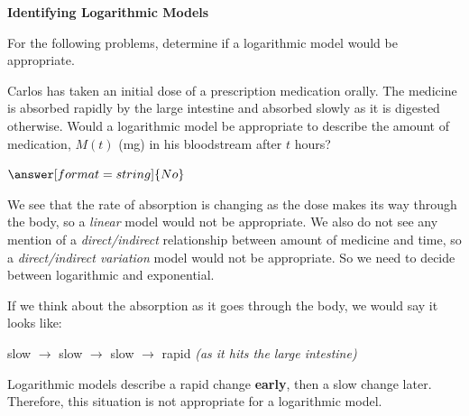 \documentclass{ximera}
\begin{document}
\begin{center} \textbf{\Large Identifying Logarithmic Models} \end{center}

For the following problems, determine if a logarithmic model would be appropriate. 


\begin{question}
Carlos has taken an initial dose of a prescription medication orally. The medicine is absorbed rapidly by the large intestine and absorbed slowly as it is digested otherwise. Would a logarithmic model be appropriate to describe the amount of medication, $M(t)$ (mg) in his bloodstream after $t$ hours?

$\answer[format=string]{No}$

\begin{feedback}
We see that the rate of absorption is changing as the dose makes its way through the body, so a \textit{linear} model would not be appropriate. We also do not see any mention of a \textit{direct/indirect} relationship between amount of medicine and time, so a \textit{direct/indirect variation} model would not be appropriate. So we need to decide between logarithmic and exponential. 

If we think about the absorption as it goes through the body, we would say it looks like:

slow $\rightarrow$ slow $\rightarrow$ slow $\rightarrow$ rapid \textit{(as it hits the large intestine)}

Logarithmic models describe a rapid change \textbf{early}, then a slow change later. Therefore, this situation is not appropriate for a logarithmic model.
\end{feedback}

\end{question}
\end{document}
